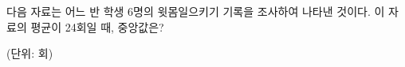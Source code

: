 다음 자료는 어느 반 학생 6명의 윗몸일으키기 기록을 조사하여 나타낸 것이다. 이 자료의 평균이 24회일 때, 중앙값은?\par\noindent\hfill{\footnotesize (단위: 회)}
